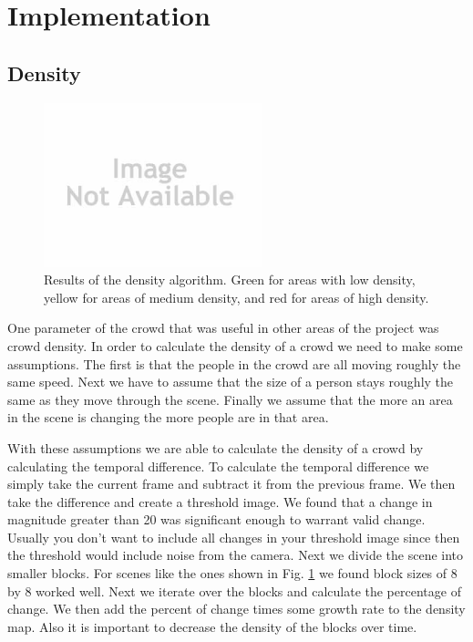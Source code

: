 \documentclass[12pt, twocolumn, conference]{IEEEtran}
\begin{document}
\section{Implementation}

\subsection{Density}

\begin{figure}[!t]
\centering
\includegraphics[width=2.5in]{noImage.jpg}
\caption{Results of the density algorithm. Green for areas with low density, yellow for areas of medium density, and red for areas of high density.}
\label{Density}
\end{figure}

One parameter of the crowd that was useful in other areas of the project was crowd density. In order to calculate the density of a crowd we need to make some assumptions. The first is that the people in the crowd are all moving roughly the same speed. Next we have to assume that the size of a person stays roughly the same as they move through the scene. Finally we assume that the more an area in the scene is changing the more people are in that area.

With these assumptions we are able to calculate the density of a crowd by calculating the temporal difference. To calculate the temporal difference we simply take the current frame and subtract it from the previous frame. We then take the difference and create a threshold image. We found that a change in magnitude greater than 20 was significant enough to warrant valid change. Usually you don’t want to include all changes in your threshold image since then the threshold would include noise from the camera. Next we divide the scene into smaller blocks. For scenes like the ones shown in Fig. \ref{Density} we found block sizes of 8 by 8 worked well. Next we iterate over the blocks and calculate the percentage of change. We then add the percent of change times some growth rate to the density map. Also it is important to decrease the density of the blocks over time.
\end{document}

